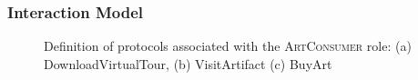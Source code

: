 \documentclass[paper=letter, fontsize=12pt]{article}
\begin{document}
\subsubsection{Interaction Model}

\begin{figure}[H]
  \begin{center}
    \caption{Definition of protocols associated with the \textsc{ArtConsumer} role: (a) \fontfamily{\sfdefault}\selectfont DownloadVirtualTour, (b) VisitArtifact (c) BuyArt}
    \label{fig:ac_protocol}
  \end{center}
\end{figure}
\end{document}
